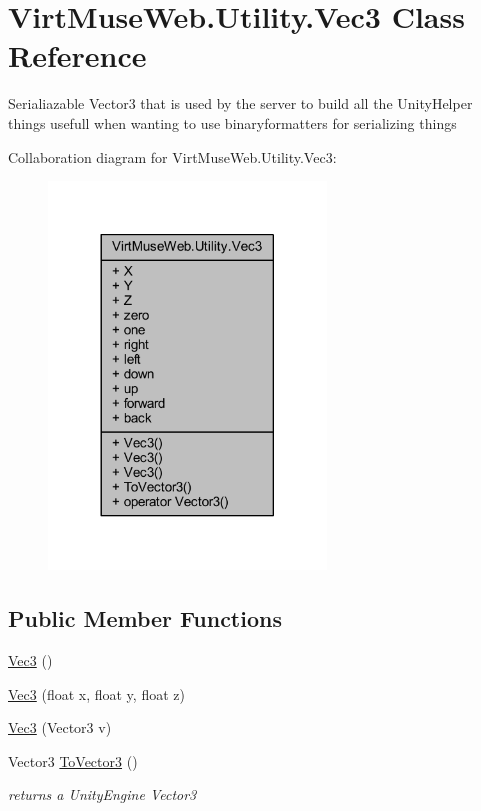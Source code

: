 \hypertarget{class_virt_muse_web_1_1_utility_1_1_vec3}{}\section{Virt\+Muse\+Web.\+Utility.\+Vec3 Class Reference}
\label{class_virt_muse_web_1_1_utility_1_1_vec3}


Serialiazable Vector3 that is used by the server to build all the Unity\+Helper things usefull when wanting to use binaryformatters for serializing things  




Collaboration diagram for Virt\+Muse\+Web.\+Utility.\+Vec3\+:
\nopagebreak
\begin{figure}[H]
\begin{center}
\leavevmode
\includegraphics[width=209pt]{class_virt_muse_web_1_1_utility_1_1_vec3__coll__graph}
\end{center}
\end{figure}
\subsection*{Public Member Functions}
\begin{DoxyCompactItemize}
\item 
\mbox{\hyperlink{class_virt_muse_web_1_1_utility_1_1_vec3_a34b343ad30e74ac4e1d92f79a420b0a0}{Vec3}} ()
\item 
\mbox{\hyperlink{class_virt_muse_web_1_1_utility_1_1_vec3_a3cd8f9a64e039ce9ccc8635a3e596cb8}{Vec3}} (float x, float y, float z)
\item 
\mbox{\hyperlink{class_virt_muse_web_1_1_utility_1_1_vec3_a370e123870e29bb0364e0bcdeb76a2ec}{Vec3}} (Vector3 v)
\item 
Vector3 \mbox{\hyperlink{class_virt_muse_web_1_1_utility_1_1_vec3_a0328deac658dc5e70dcf34da465d21fc}{To\+Vector3}} ()
\begin{DoxyCompactList}\small\item\em returns a Unity\+Engine Vector3 \end{DoxyCompactList}\end{DoxyCompactItemize}
